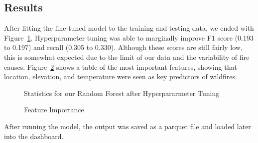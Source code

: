 \documentclass[
  12pt,
  letterpaper,
  DIV=11,
  numbers=noendperiod]{scrartcl}
\begin{document}
\subsection{Results}\label{results}

After fitting the fine-tuned model to the training and testing data, we
ended with Figure~\ref{fig-bestModelStats}. Hyperparameter tuning was
able to marginally improve F1 score (0.193 to 0.197) and recall (0.305
to 0.330). Although these scores are still fairly low, this is somewhat
expected due to the limit of our data and the variability of fire
causes. Figure~\ref{fig-featureImportance} shows a table of the most
important features, showing that location, elevation, and temperature
were seen as key predictors of wildfires.

\begin{figure}[H]

\caption{\label{fig-bestModelStats}Statistics for our Random Forest
after Hyperpararmeter Tuning}


\end{figure}%

\begin{figure}[H]

\caption{\label{fig-featureImportance}Feature Importance}


\end{figure}%

After running the model, the output was saved as a parquet file and
loaded later into the dashboard.
\end{document}
